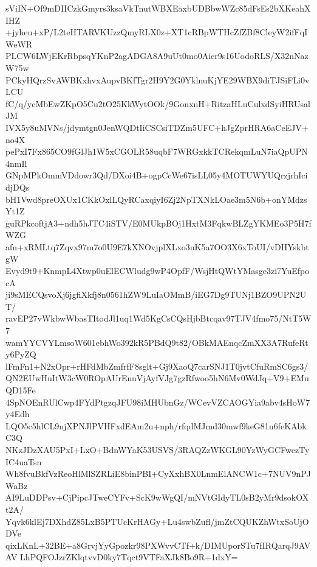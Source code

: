 sViIN+Of9mDIICzkGmyrs3ksaVkTnutWBXEaxbUDBbwWZc85dFsEs2bXKeahXIHZ
+jyheu+xP/L2teHTARVKUzzQmyRLX0z+XT1cRBpWTHcZfZBf8CleyW2ifFqIWeWR
PLCW6LWjEKrRbpsqYKnP2agADGA8A9uUt0mo0Aicr9s16UodoRLS/X32nNazW75w
PCkyHQrzSvAWBKxhvxAupvBKfTgr2H9Y2G0YklnuKjYE29WBX9diTJSiFLi0vLCU
fC/q/ycMbEwZKpO5Cu2tO25KkWytOOk/9GonxnH+RitzaHLuCulxdSyiHRUsalJM
IVX5y8uMVNs/jdymtgn0JenWQDtIiCSCsiTDZm5UFC+hJgZprHRA6aCeEJV+no4X
pePxI7Fx865CO9fGlJh1W5xCGOLR58uqbF7WRGxkkTCRekqmLuN7iaQpUPN4nmIl
GNpMPkOmmVDdowr3Qd/DXoi4B+ogpCcWe67isLL05y4MOTUWYUQrzjrhIcidjDQs
bH1Vwd8preOXUx1CKkOxlLQyRCaxqiyI6Zj2NpTXNkLOae3m5N6b+onYMdzsYt1Z
guRPkcoftjA3+ndh5hJTC4iSTV/E0MUkpBOj1HxtM3FqkwBLZgYKMEo3P5H7fWZG
afn+xRMLtq7Zqvx97m7o0U9E7kXNOvjplXLxo3uK5a7OO3X6xToUI/vDHYskbtgW
Evyd9t9+KnmpL4Xtwp0uElECWludg9wP4OpfF/WsjHtQWtYMasge3zi7YuEfpocA
ji9sMECQsvoXj6jgfiXkfj8n0561hZW9LuIaOMmB/iEG7Dg9TUNj1BZO9UPN2UT/
ravEP27vWkbwWbasTItodJl1uq1Wd5KgCsCQsHjbBtcqav97TJV4fmo75/NtT5W7
wamYYCVYLmsoW601ebhWo392kR5PBdQ9t82/OBkMAEnqcZmXX3A7RufeRty6PyZQ
lFmFn1+N2xOpr+rHFdMbZmfrfF8sglt+Gj9XaoQ7carSNJ1T0jvtCfuRmSC6gs3/
QN2EUwHuItW3cW0ROpAUrEnuVjAyfVJg7gzRfwoo5hN6Mv0WdJq+V9+EMuQD15Fe
4SpNOEnRUlCwp4FYdPtgzqJFU98iMHUbnGz/WCevVZCAOGYia9abv4sHoW7y4Edh
LQO5c5hlCL9njXPNJlPVHFxdEAm2u+nph/rfqdMJmd30mwf9keG81n6feKAbkC3Q
NKzJDzXAU5PxI+LxO+BdnWYaK53USVS/3RAQZzWKGL90YzWyGCFwczTyIC4uaTsn
Wh8fvuBkfVzReoHlMlSZRLiE8binPBI+CyXxhBX0LnmElANCW1c+7NUV9nPJWaBz
AI9LuDDPsv+CjPipcJTweCYFv+ScK9wWgQI/mNVtGIdyTL0sB2yMr9dsokOXt2A/
Yqvk6klEj7DXhdZ85LxB5PTUcKrHAGy+Lu4swbZufl/jmZtCQUKZhWtxSoUjODVe
qixLKnL+32BE+a8GrvjYyGpozkr98PXWvvCTf+k/DIMUporSTu7fIRQarqJ9AVAV
LhPQFOJzrZKlqtvvD0ky7Tqct9VTFaXJk8Bo9R+1dxY=
